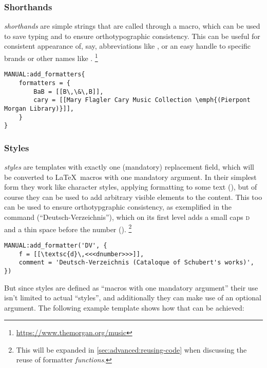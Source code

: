 \documentclass[12pt]{scrartcl}
\begin{document}
\subsubsection{Shorthands}
\label{sec:shorthands}

\emph{shorthands} are simple strings that are called through a macro, which can
be used to save typing and to ensure orthotypographic consistency.  This can be
useful for consistent appearance of, say, abbreviations like
, or an easy handle to specific brands or
other names like .%
\footnote{\url{https://www.themorgan.org/music}} %

\begin{verbatim}
MANUAL:add_formatters{
    formatters = {
        BaB = [[B\,\&\,B]],
        cary = [[Mary Flagler Cary Music Collection \emph{(Pierpont Morgan Library)}]],
    }
}
\end{verbatim}


\subsubsection{Styles}
\label{sec:defining:styles}

\emph{styles} are templates with exactly one (mandatory) replacement field,
which will be converted to \LaTeX\ macros with one mandatory argument.  In their
simplest form they work like character styles, applying formatting to some text
(), but of course they can be used
to add arbitrary visible elements to the content.  This too can be used to
ensure orthotypgraphic consistency, as exemplified in the command 
(“Deutsch-Verzeichnis”), which on its first level adds a small caps \textsc{d}
and a thin space before the number ().%
\footnote{This will be expanded in \vref{sec:advanced:reusing-code} when
discussing the reuse of formatter \emph{functions}.}

\begin{verbatim}
MANUAL:add_formatter('DV', {
    f = [[\textsc{d}\,<<<dnumber>>>]],
    comment = 'Deutsch-Verzeichnis (Cataloque of Schubert's works)',
})
\end{verbatim}

\noindent But since styles are defined as “macros with one mandatory argument”
their use isn't limited to actual “styles”, and additionally they can make use
of an optional argument.  The following example template shows how that can be
achieved:
\end{document}
